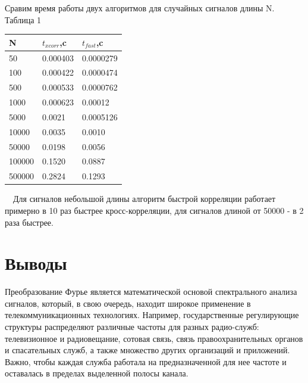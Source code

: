 \documentclass[a4paper]{article}
\begin{document}
\flushleft Сравим время работы двух алгоритмов для случайных сигналов длины N.\\
\flushright Таблица 1
\begin{center}
	\begin{tabular}{|p{3cm}|p{3cm}|p{3cm}|}
		\hline N&$t_{xcorr}$,c&$t_{fast}$,c \\
		\hline 50&0.000403&0.0000279 \\
		\hline 100&0.000422&0.0000474 \\
		\hline 500&0.000533&0.0000762 \\
		\hline 1000&0.000623&0.00012 \\
		\hline 5000&0.0021&0.0005126 \\
		\hline 10000&0.0035&0.0010 \\
		\hline 50000&0.0198&0.0056 \\
		\hline 100000&0.1520&0.0887 \\
		\hline 500000&0.2824&0.1293 \\
		\hline 
	\end{tabular}
\end{center}
~\
\flushleft Для сигналов небольшой длины алгоритм быстрой корреляции работает примерно в 10 раз быстрее кросс-корреляции, для сигналов длиной от 50000 - в 2 раза быстрее.  

\section{Выводы}
Преобразование Фурье является математической основой спектрального анализа сигналов, который, в свою очередь, находит широкое применение в телекоммуникационных технологиях. Например, государственные регулирующие структуры распределяют различные частоты для разных радио-служб: телевизионное и радиовещание, сотовая связь, связь правоохранительных органов и спасательных служб, а также множество других организаций и приложений. Важно, чтобы каждая служба работала на предназначенной для нее частоте и оставалась в пределах выделенной полосы канала. 
\end{document}
